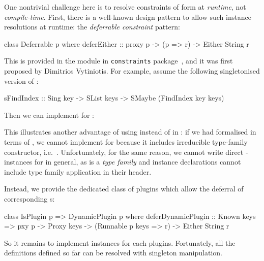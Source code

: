 \documentclass[demotion-paper.tex]{subfiles}
\begin{document}
One nontrivial challenge here is to resolve constraints of form  at \emph{runtime}, not \emph{compile-time}.
First, there is a well-known design pattern to allow such instance resolutions at runtime: the \emph{deferrable constraint} pattern:
\begin{code}
class Deferrable p where
  deferEither :: proxy p -> (p => r) 
              -> Either String r
\end{code}
This is provided in the module  in \texttt{constraints} package~\cite{Kmett:2020ab}, and it was first proposed by Dimitrios Vytiniotis.
For example, assume the following singletonised version of :
\begin{code}
sFindIndex :: Sing key -> SList keys
      -> SMaybe (FindIndex key keys)
\end{code}
Then we can implement  for :
This illustrates another advantage of using  instead of  in : if we had formalised  in terms of , we cannot implement  for  because it includes irreducible type-family constructor, i.e.\ .
Unfortunately, for the same reason, we cannot write direct -instances for  in general, as  is a \emph{type family} and instance declarations cannot include type family application in their header.

Instead, we provide the dedicated class  of plugins which allow the deferral of corresponding s:
\begin{code}
class IsPlugin p => DynamicPlugin p where
  deferDynamicPlugin
    :: Known keys
    => pxy p -> Proxy keys
    -> (Runnable p keys => r) -> Either String r
\end{code}
So it remains to implement  instances for each plugins.
Fortunately, all the  definitions defined so far can be resolved with singleton manipulation.
\end{document}
